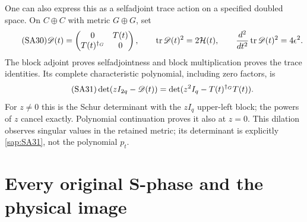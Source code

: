 One can also express this as a selfadjoint trace action
on a specified doubled space. On $C\oplus C$ with metric
$G\oplus G$, set
\begin{equation}\tag{SA30}\label{sap:SA30}
\mathscr D(t)=
\begin{pmatrix}0&T(t)\\T(t)^{\dagger_G}&0\end{pmatrix},
\qquad
\operatorname{tr}\mathscr D(t)^2=2\mathcal H(t),\qquad
\frac{d^2}{dt^2}\operatorname{tr}\mathscr D(t)^2=4\epsilon^2 .
\end{equation}
The block adjoint proves selfadjointness and block
multiplication proves the trace identities. Its complete
characteristic polynomial, including zero factors, is
\begin{equation}\tag{SA31}\label{sap:SA31}
\det(zI_{2q}-\mathscr D(t))
=\det(z^2I_q-T(t)^{\dagger_G}T(t)).
\end{equation}
For $z\ne0$ this is the Schur determinant with the
$zI_q$ upper-left block; the powers of $z$ cancel
exactly. Polynomial continuation proves it also at
$z=0$. This dilation observes singular values in the
retained metric; its determinant is explicitly
\eqref{sap:SA31}, not the polynomial $p_t$.

\section{Every original S-phase and the physical image}

